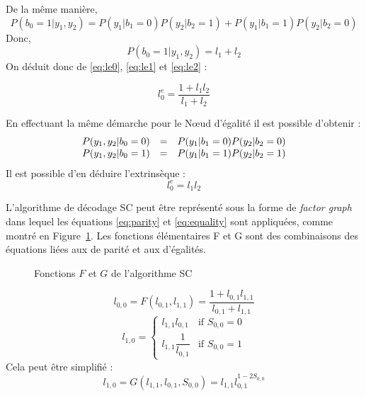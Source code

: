 De la même manière,
\begin{equation}
P(b_0 = 1 | y_1,y_2) =P(y_1 | b_1 = 0)P(y_2 | b_2 = 1) + P(y_1 | b_1 = 1)P(y_2 | b_2 = 0)
\end{equation}
Donc, 
\begin{equation}
P(b_0 = 1 | y_1,y_2) = l_1 + l_2
\label{eq:le2}
\end{equation}
On déduit donc de \ref{eq:le0}, \ref{eq:le1} et \ref{eq:le2} : 

\begin{equation}
l^e_0=\dfrac{1 + l_1l_2}{l_1+l_2}
\label{eq:parity}
\end{equation}

En effectuant la même démarche pour le N\oe{}ud d'égalité il est possible d'obtenir :
\begin{eqnarray*}
\begin{array}{r c l}
P(y_1,y_2|b_0=0) & = & P(y_1|b_1=0) P(y_2 | b_2 = 0) \\
P(y_1,y_2|b_0=1) & = & P(y_1|b_1=1) P(y_2 | b_2 = 1) 
\end{array}
\end{eqnarray*}
Il est possible d'en déduire l'extrinsèque :
\begin{equation}
l^e_0=l_1l_2
\label{eq:equality}
\end{equation}

L'algorithme de décodage SC peut être représenté sous la forme de \textit{factor graph} dans lequel les équations \ref{eq:parity} et \ref{eq:equality} sont appliquées, comme montré en Figure~\ref{fig:SCSchedule}. Les fonctions élémentaires F et G sont des combinaisons des équations liées aux \noeuds de parité et aux \noeuds d'égalités.
\begin{figure}[t]
  \centering
  \quad\quad\quad\quad
  \caption{Fonctions $F$ et $G$ de l'algorithme SC}
  \label{fig:SCSchedule}
\end{figure}
\begin{equation}
l_{0,0} = F(l_{0,1}, l_{1,1}) = \dfrac{1+l_{0,1}l_{1,1}}{l_{0,1}+l_{1,1}}
\end{equation}
\[
	l_{1,0} = 
	\begin{cases} 
	l_{1,1}l_{0,1} & \text{if }S_{0,0} = 0\\
	l_{1,1}\dfrac{1}{l_{0,1}} & \text{if }S_{0,0} = 1
	\end{cases}
\]
Cela peut être simplifié : 
\begin{equation}
l_{1,0} = G(l_{1,1},l_{0,1},S_{0,0}) = l_{1,1}l_{0,1}^{1 - 2S_{0,0}}
\end{equation}

